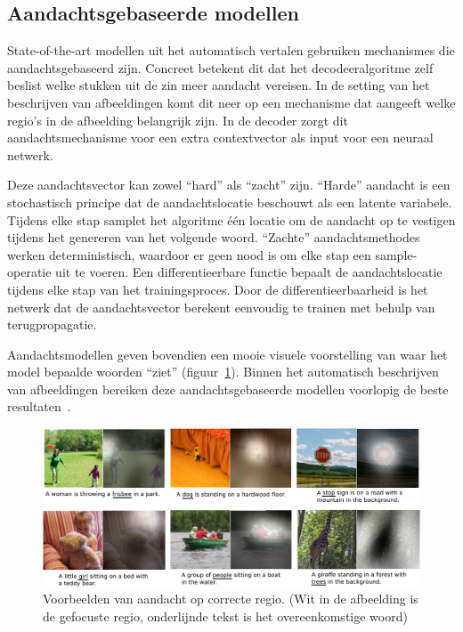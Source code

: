 \subsection{Aandachtsgebaseerde modellen}
State-of-the-art modellen uit het automatisch vertalen gebruiken mechanismes die aandachtsgebaseerd zijn. Concreet betekent dit dat het decodeeralgoritme zelf beslist welke stukken uit de zin meer aandacht vereisen.
In de setting van het beschrijven van afbeeldingen komt dit neer op een mechanisme dat aangeeft welke regio's in de afbeelding belangrijk zijn. In de decoder zorgt dit aandachtsmechanisme voor een extra contextvector als input voor een neuraal netwerk. 

Deze aandachtsvector kan zowel ``hard'' als ``zacht'' zijn. ``Harde'' aandacht is een stochastisch principe dat de aandachtslocatie beschouwt als een latente variabele. Tijdens elke stap samplet het algoritme \'e\'en locatie om de aandacht op te vestigen tijdens het genereren van het volgende woord. ``Zachte'' aandachtsmethodes werken deterministisch, waardoor er geen nood is om elke stap een sample-operatie uit te voeren. Een differentieerbare functie bepaalt de aandachtslocatie tijdens elke stap van het trainingsproces. Door de differentieerbaarheid is het netwerk dat de aandachtsvector berekent eenvoudig te trainen met behulp van terugpropagatie.

Aandachtsmodellen geven bovendien een mooie visuele voorstelling van waar het model bepaalde woorden ``ziet'' (figuur~\ref{fig:attention-example}). Binnen het automatisch beschrijven van afbeeldingen bereiken deze aandachtsgebaseerde modellen voorlopig de beste resultaten~\cite{Jin2015,Xu2015}.

\begin{figure}[tb]
	\centering
	\includegraphics[width=\linewidth]{Images/good_Xu.pdf}
	\caption[Voorbeelden van aandacht op correcte regio.]{Voorbeelden van aandacht op correcte regio. (Wit in de afbeelding is de gefocuste regio, onderlijnde tekst is het overeenkomstige woord)~\cite{Xu2015}}
	\label{fig:attention-example}
\end{figure}


